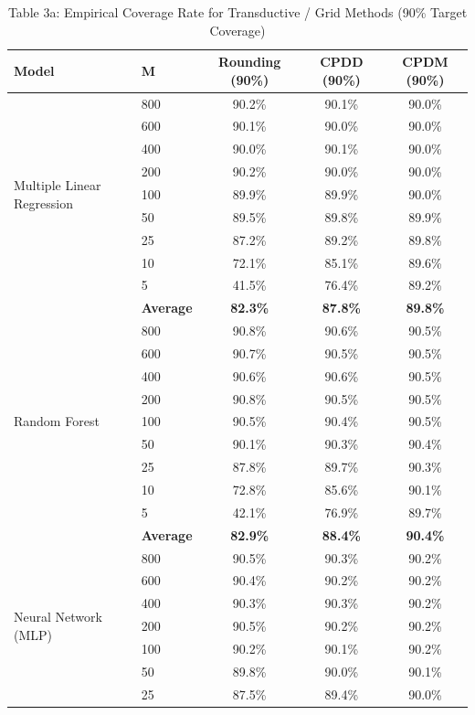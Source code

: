\documentclass[11pt,a4paper]{article}
\begin{document}
\begin{table}[H]
\centering
\caption{Table 3a: Empirical Coverage Rate for Transductive / Grid Methods (90\% Target Coverage)}
\label{tab:mvp_tab3a}
\scriptsize
\begin{tabular}{llccc}
\toprule
Model & M & Rounding (90\%) & CPDD (90\%) & CPDM (90\%) \\
\midrule
\multirow{9}{*}{Multiple Linear Regression}
 & 800 & 90.2\% & 90.1\% & 90.0\% \\
 & 600 & 90.1\% & 90.0\% & 90.0\% \\
 & 400 & 90.0\% & 90.1\% & 90.0\% \\
 & 200 & 90.2\% & 90.0\% & 90.0\% \\
 & 100 & 89.9\% & 89.9\% & 90.0\% \\
 & 50  & 89.5\% & 89.8\% & 89.9\% \\
 & 25  & 87.2\% & 89.2\% & 89.8\% \\
 & 10  & 72.1\% & 85.1\% & 89.6\% \\
 & 5   & 41.5\% & 76.4\% & 89.2\% \\
 & \textbf{Average} & \textbf{82.3\%} & \textbf{87.8\%} & \textbf{89.8\%} \\
\midrule
\multirow{9}{*}{Random Forest}
 & 800 & 90.8\% & 90.6\% & 90.5\% \\
 & 600 & 90.7\% & 90.5\% & 90.5\% \\
 & 400 & 90.6\% & 90.6\% & 90.5\% \\
 & 200 & 90.8\% & 90.5\% & 90.5\% \\
 & 100 & 90.5\% & 90.4\% & 90.5\% \\
 & 50  & 90.1\% & 90.3\% & 90.4\% \\
 & 25  & 87.8\% & 89.7\% & 90.3\% \\
 & 10  & 72.8\% & 85.6\% & 90.1\% \\
 & 5   & 42.1\% & 76.9\% & 89.7\% \\
 & \textbf{Average} & \textbf{82.9\%} & \textbf{88.4\%} & \textbf{90.4\%} \\
\midrule
\multirow{9}{*}{Neural Network (MLP)}
 & 800 & 90.5\% & 90.3\% & 90.2\% \\
 & 600 & 90.4\% & 90.2\% & 90.2\% \\
 & 400 & 90.3\% & 90.3\% & 90.2\% \\
 & 200 & 90.5\% & 90.2\% & 90.2\% \\
 & 100 & 90.2\% & 90.1\% & 90.2\% \\
 & 50  & 89.8\% & 90.0\% & 90.1\% \\
 & 25  & 87.5\% & 89.4\% & 90.0\% \\

\end{tabular}
\end{table}
\end{document}
